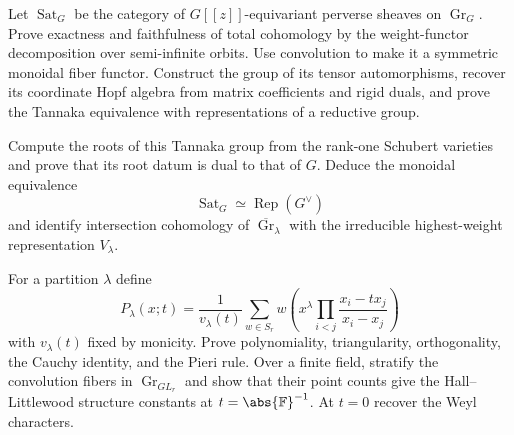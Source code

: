 \begin{exercise}
Let $\operatorname{Sat}_G$ be the category of $G[[z]]$-equivariant perverse
sheaves on $\operatorname{Gr}_G$.  Prove exactness and faithfulness of total
cohomology by the weight-functor decomposition over semi-infinite orbits.
Use convolution to make it a symmetric monoidal fiber functor.  Construct the
group of its tensor automorphisms, recover its coordinate Hopf algebra from
matrix coefficients and rigid duals, and prove the Tannaka equivalence with
representations of a reductive group.
\end{exercise}

\begin{exercise}
Compute the roots of this Tannaka group from the
rank-one Schubert varieties and prove that its root datum is dual to that of
$G$.  Deduce the monoidal equivalence
\[
 \operatorname{Sat}_G\simeq\operatorname{Rep}(G^\vee)
\]
and identify intersection cohomology of $\overline{\operatorname{Gr}}_\lambda$
with the irreducible highest-weight representation $V_\lambda$.
\end{exercise}

\begin{exercise}
For a partition $\lambda$ define
\[
 P_\lambda(x;t)=\frac1{v_\lambda(t)}
 \sum_{w\in S_r}w\!\left(x^\lambda
 \prod_{i<j}\frac{x_i-tx_j}{x_i-x_j}\right)
\]
with $v_\lambda(t)$ fixed by monicity.  Prove polynomiality, triangularity,
orthogonality, the Cauchy identity, and the Pieri rule.  Over a finite field,
stratify the convolution fibers in $\operatorname{Gr}_{GL_r}$ and show that
their point counts give the Hall--Littlewood structure constants at
$t=\abs{\mathbb F}^{-1}$.  At $t=0$ recover the Weyl characters.
\end{exercise}

